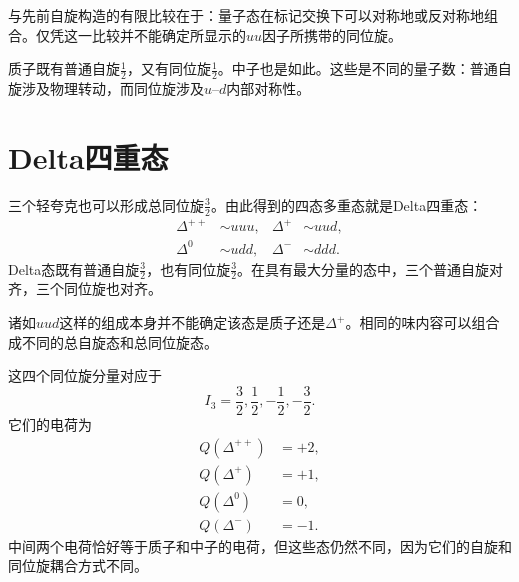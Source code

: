 
与先前自旋构造的有限比较在于：量子态在标记交换下可以对称地或反对称地组合。仅凭这一比较并不能确定所显示的\(uu\)因子所携带的同位旋。

质子既有普通自旋\(\tfrac12\)，又有同位旋\(\tfrac12\)。中子也是如此。这些是不同的量子数：普通自旋涉及物理转动，而同位旋涉及\(u\)--\(d\)内部对称性。

\section{Delta四重态}

三个轻夸克也可以形成总同位旋\(\tfrac32\)。由此得到的四态多重态就是Delta四重态：
\begin{equation}
\begin{aligned}
\Delta^{++}&\sim uuu,
&
\Delta^{+}&\sim uud,
\\
\Delta^{0}&\sim udd,
&
\Delta^{-}&\sim ddd.
\end{aligned}
\end{equation}
Delta态既有普通自旋\(\tfrac32\)，也有同位旋\(\tfrac32\)。在具有最大分量的态中，三个普通自旋对齐，三个同位旋也对齐。

诸如\(uud\)这样的组成本身并不能确定该态是质子还是\(\Delta^+\)。相同的味内容可以组合成不同的总自旋态和总同位旋态。

\begin{classroomqa}
\end{classroomqa}

\begin{classroomqa}
\end{classroomqa}

这四个同位旋分量对应于
\begin{equation}
I_3=\frac32,\frac12,-\frac12,-\frac32.
\end{equation}
它们的电荷为
\begin{align}
Q(\Delta^{++})&=+2,\\
Q(\Delta^{+})&=+1,\\
Q(\Delta^{0})&=0,\\
Q(\Delta^{-})&=-1.
\end{align}
中间两个电荷恰好等于质子和中子的电荷，但这些态仍然不同，因为它们的自旋和同位旋耦合方式不同。

